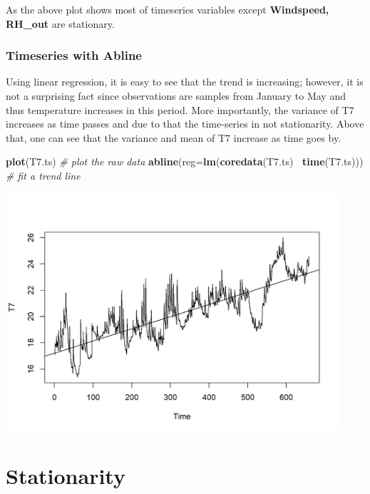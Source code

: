 \documentclass[]{article}
\newenvironment{Shaded}{\begin{snugshade}}{\end{snugshade}}
\newcommand{\KeywordTok}[1]{\textcolor[rgb]{0.13,0.29,0.53}{\textbf{#1}}}
\newcommand{\DataTypeTok}[1]{\textcolor[rgb]{0.13,0.29,0.53}{#1}}
\newcommand{\CommentTok}[1]{\textcolor[rgb]{0.56,0.35,0.01}{\textit{#1}}}
\newcommand{\OperatorTok}[1]{\textcolor[rgb]{0.81,0.36,0.00}{\textbf{#1}}}
\newcommand{\NormalTok}[1]{#1}
\begin{document}
As the above plot shows most of timeseries variables except
\textbf{Windspeed, RH\_out} are stationary.

\subsubsection{Timeseries with Abline}\label{timeseries-with-abline}

Using linear regression, it is easy to see that the trend is increasing;
however, it is not a surprising fact since observations are samples from
January to May and thus temperature increases in this period. More
importantly, the variance of T7 increases as time passes and due to that
the time-series in not stationarity. Above that, one can see that the
variance and mean of T7 increase as time goes by.

\begin{Shaded}
\begin{Highlighting}[]
\KeywordTok{plot}\NormalTok{(T7.ts) }\CommentTok{# plot the raw data}
\KeywordTok{abline}\NormalTok{(}\DataTypeTok{reg=}\KeywordTok{lm}\NormalTok{(}\KeywordTok{coredata}\NormalTok{(T7.ts) }\OperatorTok{~}\KeywordTok{time}\NormalTok{(T7.ts))) }\CommentTok{# fit a trend line}
\end{Highlighting}
\end{Shaded}

\includegraphics[width=468]{README_figs/README-unnamed-chunk-9-1}

\section{Stationarity}\label{stationarity}
\end{document}
